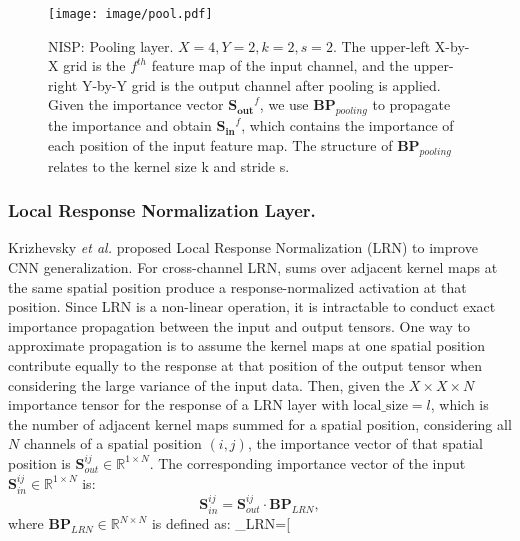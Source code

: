 \documentclass[10pt,twocolumn,letterpaper]{article}
\begin{document}
\begin{figure}[t]
\begin{center}
   \texttt{[image: image/pool.pdf]}
\end{center}
   \caption{NISP: Pooling layer. $X=4, Y=2, k=2, s=2$. The upper-left X-by-X grid is the $f^{th}$ feature map of the input channel, and the upper-right Y-by-Y grid is the output channel after pooling is applied. Given the importance vector $\mathbf{S_{out}}^f$, we use $\mathbf{BP}_{pooling}$ to propagate the importance and obtain $\mathbf{S_{in}}^f$, which contains the importance of each position of the input feature map. The structure of $\mathbf{BP}_{pooling}$ relates to the kernel size k and stride s.}
\label{fig:long}
\end{figure}\subsubsection{Local Response Normalization Layer.}
Krizhevsky \emph{et al.}\cite{Alexnet} proposed Local Response Normalization (LRN) to improve CNN generalization.
For cross-channel LRN, sums over adjacent kernel maps at the same spatial position produce a response-normalized activation at that position. 
Since LRN is a non-linear operation, it is intractable to conduct exact importance propagation between the input and output tensors. 
One way to approximate propagation is to assume the kernel maps at one spatial position contribute equally to the response at that position of the output tensor when considering the large variance of the input data. 
Then, given the $X\times X \times N$ importance tensor for the response of a LRN layer with $\text{local}\_\text{size} = l$, which is the number of adjacent kernel maps summed for a spatial position, considering all $N$ channels of a spatial position $(i,j)$, the importance vector of that spatial position is $\mathbf{S}_{out}^{ij} \in \mathbb{R}^{1 \times N}$. The corresponding importance vector of the input $\mathbf{S}_{in}^{ij} \in \mathbb{R}^{1 \times N}$ is: 
\begin{equation}
\label{lrn}
\mathbf{S}_{in}^{ij}=\mathbf{S}_{out}^{ij} \cdot \mathbf{BP}_{LRN},
\end{equation}
where $\mathbf{BP}_{LRN} \in \mathbb{R}^{N \times N}$ is defined as:
\label{BP_LRN}
_{LRN}=\left[
\renewcommand{\arraystretch}{0.6}
\setlength{\arraycolsep}{1pt}
\end{document}
